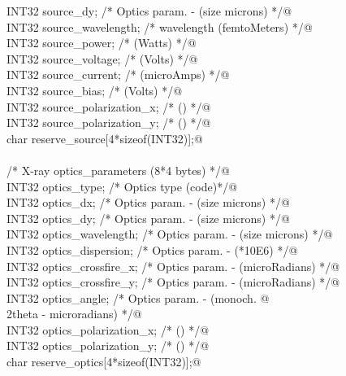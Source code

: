 \documentclass[10pt,a4paper,twoside,notitlepage]{article}
\begin{document}
\begin{flushleft}
\begin{minipage}{\linewidth}
\begin{list}{}{}
\mbox{}\verb@         INT32 source_dy;                /* Optics param. - (size  microns) */@\\
\mbox{}\verb@         INT32 source_wavelength;        /* wavelength  (femtoMeters) */@\\
\mbox{}\verb@         INT32 source_power;             /* (Watts) */@\\
\mbox{}\verb@         INT32 source_voltage;           /* (Volts) */@\\
\mbox{}\verb@         INT32 source_current;           /* (microAmps) */@\\
\mbox{}\verb@         INT32 source_bias;              /* (Volts) */@\\
\mbox{}\verb@         INT32 source_polarization_x;    /* () */@\\
\mbox{}\verb@         INT32 source_polarization_y;    /* () */@\\
\mbox{}\verb@         char reserve_source[4*sizeof(INT32)];@\\
\mbox{}\verb@@\\
\mbox{}\verb@         /* X-ray optics_parameters (8*4 bytes) */@\\
\mbox{}\verb@         INT32 optics_type;              /* Optics type (code)*/@\\
\mbox{}\verb@         INT32 optics_dx;                /* Optics param. - (size  microns) */@\\
\mbox{}\verb@         INT32 optics_dy;                /* Optics param. - (size  microns) */@\\
\mbox{}\verb@         INT32 optics_wavelength;        /* Optics param. - (size  microns) */@\\
\mbox{}\verb@         INT32 optics_dispersion;        /* Optics param. - (*10E6) */@\\
\mbox{}\verb@         INT32 optics_crossfire_x;       /* Optics param. - (microRadians) */@\\
\mbox{}\verb@         INT32 optics_crossfire_y;       /* Optics param. - (microRadians) */@\\
\mbox{}\verb@         INT32 optics_angle;             /* Optics param. - (monoch.  @\\
\mbox{}\verb@                                                    2theta - microradians) */@\\
\mbox{}\verb@         INT32 optics_polarization_x;    /* () */@\\
\mbox{}\verb@         INT32 optics_polarization_y;    /* () */@\\
\mbox{}\verb@         char reserve_optics[4*sizeof(INT32)];@\\

\end{list}
\end{minipage}
\end{flushleft}
\end{document}
